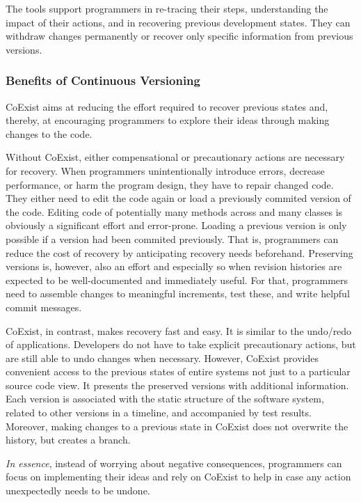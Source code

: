 The tools support programmers in re-tracing their steps, understanding the impact of their actions, and in recovering previous development states.
They can withdraw changes permanently or recover only specific information from previous versions.


\subsubsection{Benefits of Continuous Versioning}

CoExist aims at reducing the effort required to recover previous states and, thereby, at encouraging programmers to explore their ideas through making changes to the code.

Without CoExist, either compensational or precautionary actions are necessary for recovery.
When programmers unintentionally introduce errors, decrease performance, or harm the program design, they have to repair changed code.
They either need to edit the code again or load a previously commited version of the code.
Editing code of potentially many methods across and many classes is obviously a significant effort and error-prone.
Loading a previous version is only possible if a version had been commited previously.
That is, programmers can reduce the cost of recovery by anticipating recovery needs beforehand.
Preserving versions is, however, also an effort and especially so when revision histories are expected to be well-documented and immediately useful.
For that, programmers need to assemble changes to meaningful increments, test these, and write helpful commit messages.

CoExist, in contrast, makes recovery fast and easy.
It is similar to the undo/redo of applications.
Developers do not have to take explicit precautionary actions, but are still able to undo changes when necessary.
However, CoExist provides convenient access to the previous states of entire systems not just to a particular source code view.
It presents the preserved versions with additional information.
Each version is associated with the static structure of the software system, related to other versions in a timeline, and accompanied by test results.
Moreover, making changes to a previous state in CoExist does not overwrite the history, but creates a branch.

\emph{In essence}, instead of worrying about negative consequences, programmers can focus on implementing their ideas and rely on CoExist to help in case any action unexpectedly needs to be undone.
